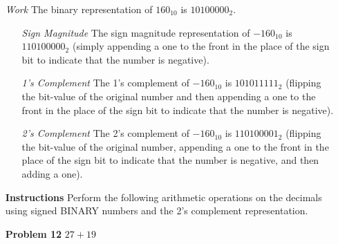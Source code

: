 \documentclass[12pt]{article}
\begin{document}
\begin{enumerate}
  \item[\textit{Work}] The binary representation of $160_{10}$ is $10100000_2$.
  \begin{enumerate}
    \item[\textit{Sign Magnitude}] The sign magnitude representation of $-160_{10}$ is $110100000_2$ (simply appending a one to the front in the place of the sign bit to indicate that the number is negative).
    \item[\textit{1's Complement}] The 1's complement of $-160_{10}$ is $101011111_2$ (flipping the bit-value of the original number and then appending a one to the front in the place of the sign bit to indicate that the number is negative).
    \item[\textit{2's Complement}] The 2's complement of $-160_{10}$ is $110100001_2$ (flipping the bit-value of the original number, appending a one to the front in the place of the sign bit to indicate that the number is negative, and then adding a one).
  \end{enumerate}
\end{enumerate}

\begin{enumerate}
  \item[\textbf{Instructions}] Perform the following arithmetic operations on the decimals using signed BINARY numbers and the 2’s complement representation.
\end{enumerate}

\begin{enumerate}
  \item[\textbf{Problem 12}] $27+19$
\end{enumerate}
\end{document}
